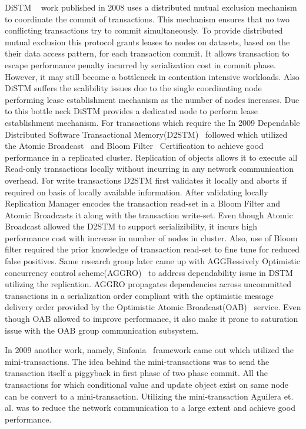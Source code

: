 \documentclass[12pt,english]{report}
\begin{document}
DiSTM ~\cite{Kotselidis08distm:a} work published in 2008 uses a distributed
mutual exclusion mechanism to coordinate the commit of transactions. This mechanism ensures that no two conflicting transactions try to commit simultaneously. To provide distributed mutual exclusion this protocol grants leases to nodes on datasets, based on the their data access pattern, for each transaction commit. It allows transaction to escape performance penalty incurred by serialization cost in commit phase. However, it may still become a bottleneck in contention intensive workloads. Also DiSTM suffers the scalibility issues due to the single coordinating node performing lease establishment mechanism as the number of nodes increases. Due to this bottle neck DiSTM provides a dedicated node to perform lease establishment mechanism.
For transactions which require the  
In 2009 Dependable Distributed Software Transactional Memory(D2STM)~\cite{D2STM:5368778} followed which utilized the Atomic Broadcast~\cite{Defago:2004:TOB:1041680.1041682} and Bloom Filter~\cite{Bloom:1970:STH:362686.362692} Certification to achieve good performance in a replicated cluster. Replication of objects allows it to execute all Read-only transactions locally without incurring in any network communication overhead. For write transactions D2STM first validates it locally and aborts if required on basis of locally available information. After validating locally Replication Manager encodes the transaction read-set in a Bloom Filter and Atomic Broadcasts it along with the transaction write-set. Even though Atomic Broadcast allowed the D2STM to support serializibility, it incurs high performance cost with increase in number of nodes in cluster. Also, use of Bloom filter required the prior knowledge of transaction read-set to fine tune for reduced false positives. Same research group later came up with AGGRessively Optimistic concurrency control scheme(AGGRO)~\cite{AGGRO:5598236} to address dependability issue in DSTM utilizing the replication. AGGRO propagates dependencies across uncommitted transactions in a serialization order compliant with the optimistic message delivery order provided by the Optimistic Atomic Broadcast(OAB)~\cite{OAB:Pedone200379} service. Even though OAB allowed to improve performance, it also make it prone to saturation issue with the OAB group communication subsystem.  

In 2009 another work, namely, Sinfonia~\cite{Aguilera:2009:SNP:1629087.1629088} framework came out which utilized the mini-transactions. The idea behind the mini-transactions was to send the transaction itself a piggyback in first phase of two phase commit. All the transactions for which conditional value and update object exist on same node can be convert to a mini-transaction. Utilizing the mini-transaction Aguilera et. al. was to reduce the network communication to a large extent and achieve good performance.
\end{document}
